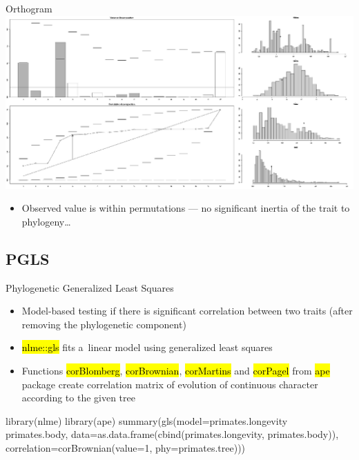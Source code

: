 \documentclass[compress, ucs, xelatex, 11pt, xcolor=svgnames,
  hyperref={
    bookmarks=true,
    unicode=true,
    colorlinks=true,
    pdftitle={Molecular data in R},
    plainpages=false,
    pdfauthor={Vojtech Zeisek},
    pdfsubject={Course about phylogeny and evolution in R},
    pdfcreator={XeLaTeX},
    pdfkeywords={R, evolution, phylogeny, molecular data},
    linkcolor=Tomato,
    anchorcolor=SaddleBrown,
    citecolor=Goldenrod,
    filecolor=DarkMagenta,
    menucolor=Sienna,
    urlcolor=DarkTurquoise,
    pdftex},
  url={hyphens, lowtilde} %
  ]{beamer}
\renewcommand{\texttt}[1]{\hl{\ttfamily #1}}
\begin{document}
\begin{frame}{Orthogram}
  \includegraphics[width=\textwidth]{orthogram.png}
  \begin{itemize}
    \item Observed value is within permutations --- no significant inertia of the trait to phylogeny\ldots
  \end{itemize}
\end{frame}

\subsection{PGLS}

\begin{frame}[fragile]{Phylogenetic Generalized Least Squares}
  \begin{itemize}
    \item Model-based testing if there is significant correlation between two traits (after removing the phylogenetic component)
    \item \texttt{nlme::gls} fits a~linear model using generalized least squares
    \item Functions \texttt{corBlomberg}, \texttt{corBrownian}, \texttt{corMartins} and \texttt{corPagel} from \texttt{ape} package create correlation matrix of evolution of continuous character according to the given tree
  \end{itemize}
  \begin{spluscode}
    library(nlme)
    library(ape)
    summary(gls(model=primates.longevity ~ primates.body,
      data=as.data.frame(cbind(primates.longevity, primates.body)),
      correlation=corBrownian(value=1, phy=primates.tree)))
  \end{spluscode}
\end{frame}
\end{document}
